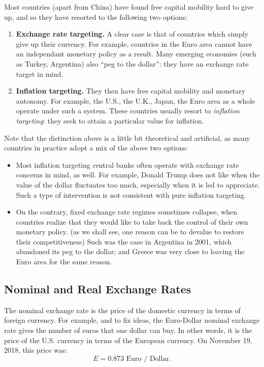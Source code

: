 \documentclass[]{book}
\begin{document}
Most countries (apart from China) have found free capital mobility hard
to give up, and so they have resorted to the following two options:

\begin{enumerate}
\def\labelenumi{\arabic{enumi}.}
\item
  \textbf{Exchange rate targeting.} A clear case is that of countries
  which simply give up their currency. For example, countries in the
  Euro area cannot have an independant monetary policy as a result. Many
  emerging economies (such as Turkey, Argentina) also ``peg to the
  dollar'': they have an exchange rate target in mind.
\item
  \textbf{Inflation targeting.} They then have free capital mobility and
  monetary autonomy. For example, the U.S., the U.K., Japan, the Euro
  area as a whole operate under such a system. These countries usually
  resort to \emph{inflation targeting}: they seek to attain a particular
  value for inflation.
\end{enumerate}

Note that the distinction above is a little bit theoretical and
artificial, as many countries in practice adopt a mix of the above two
options:

\begin{itemize}
\item
  Most inflation targeting central banks often operate with exchange
  rate concerns in mind, as well. For example, Donald Trump does not
  like when the value of the dollar fluctuates too much, especially when
  it is led to appreciate. Such a type of intervention is not consistent
  with pure inflation targeting.
\item
  On the contrary, fixed exchange rate regimes sometimes collapse, when
  countries realize that they would like to take back the control of
  their own monetary policy. (as we shall see, one reason can be to
  devalue to restore their competitiveness) Such was the case in
  Argentina in 2001, which abandoned its peg to the dollar; and Greece
  was very close to leaving the Euro area for the same reason.
\end{itemize}

\subsection{Nominal and Real Exchange
Rates}\label{nominal-and-real-exchange-rates}

The nominal exchange rate is the price of the domestic currency in terms
of foreign currency. For example, and to fix ideas, the Euro-Dollar
nominal exchange rate gives the number of euros that one dollar can buy.
In other words, it is the price of the U.S. currency in terms of the
European currency. On November 19, 2018, this price was:
\[E=0.873 \text{ Euro / Dollar.}\]
\end{document}
